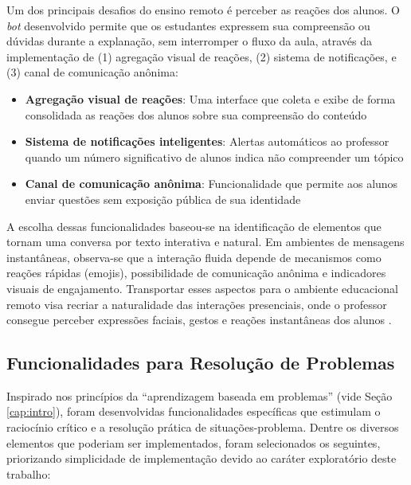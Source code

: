 Um dos principais desafios do ensino remoto é perceber as reações dos alunos. O
\textit{bot} desenvolvido permite que os estudantes expressem sua compreensão ou
dúvidas durante a explanação, sem interromper o fluxo da aula, através da 
implementação de (1) agregação visual de reações, (2) sistema de notificações, e
(3) canal de comunicação anônima:

\begin{itemize}
\item \textbf{Agregação visual de reações}: Uma interface que coleta e exibe 
de forma consolidada as reações dos alunos sobre sua compreensão do conteúdo
\item \textbf{Sistema de notificações inteligentes}: Alertas automáticos ao 
professor quando um número significativo de alunos indica não compreender um tópico
\item \textbf{Canal de comunicação anônima}: Funcionalidade que permite aos 
alunos enviar questões sem exposição pública de sua identidade
\end{itemize}

A escolha dessas funcionalidades baseou-se na identificação de elementos que
tornam uma conversa por texto interativa e natural. Em ambientes de mensagens
instantâneas, observa-se que a interação fluida depende de mecanismos como
reações rápidas (emojis), possibilidade de comunicação anônima e indicadores
visuais de engajamento. Transportar esses aspectos para o ambiente educacional
remoto visa recriar a naturalidade das interações presenciais, onde o professor
consegue perceber expressões faciais, gestos e reações instantâneas dos
alunos \cite{huang2021}.

\subsection{Funcionalidades para Resolução de Problemas}
\label{subsec:pbl}

Inspirado nos princípios da ``aprendizagem baseada em problemas'' (vide Seção 
\ref{cap:intro}), foram desenvolvidas funcionalidades específicas que estimulam
o raciocínio crítico e a resolução prática de situações-problema. Dentre os 
diversos elementos que poderiam ser implementados, foram selecionados os 
seguintes, priorizando simplicidade de implementação devido ao caráter 
exploratório deste trabalho:

